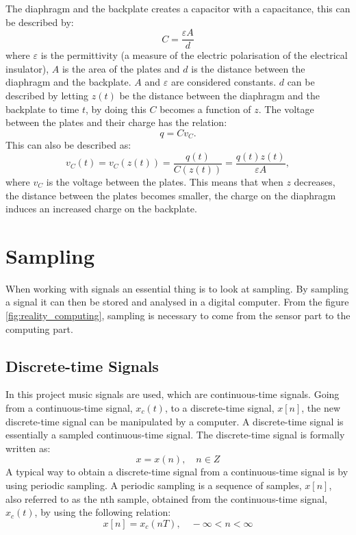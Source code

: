 \noindent The diaphragm and the backplate creates a capacitor with a capacitance, this can be described by:
$$ C = \dfrac{\varepsilon A}{d}$$ 
\indent where $\varepsilon$ is the permittivity (a measure of the electric polarisation of the electrical insulator), $A$ is the area of the plates and $d$ is the distance between the diaphragm and the backplate. $A$ and $\varepsilon$ are considered constants. $d$ can be described by letting $z(t)$ be the distance between the diaphragm and the backplate to time $t$, by doing this $C$ becomes a function of $z$. The voltage between the plates and their charge has the relation:
$$q=C v_C.$$
This can also be described as:
$$v_C(t)=v_C(z(t))= \dfrac{q(t)}{C(z(t))} = \dfrac{q(t)z(t)}{\varepsilon A},$$
\indent where $v_C$ is the voltage between the plates. This means that when $z$ decreases, the distance between the plates becomes smaller, the charge on the diaphragm induces an increased charge on the backplate. 
\cite[p. 160-161]{LectureNotes}


\section{Sampling}

When working with signals an essential thing is to look at sampling. By sampling a signal it can then be stored and analysed in a digital computer. From the figure \ref{fig:reality_computing}, sampling is necessary to come from the sensor part to the computing part.  \\ 

\subsection{Discrete-time Signals}
In this project music signals are used, which are continuous-time signals. Going from a continuous-time signal, $x_c(t)$, to a discrete-time signal, $x[n]$, the new discrete-time signal can be manipulated by a computer. A discrete-time signal is essentially a sampled continuous-time signal. The discrete-time signal is formally written as:
$$x={x(n)}, \quad    n \in Z$$
A typical way to obtain a discrete-time signal from a continuous-time signal is by using periodic sampling. A periodic sampling is a sequence of samples, $x[n]$, also referred to as the nth sample, obtained from the continuous-time signal, $x_c(t)$, by using the following relation:
$$x[n]=x_c (nT), \quad    - \infty <n< \infty$$

